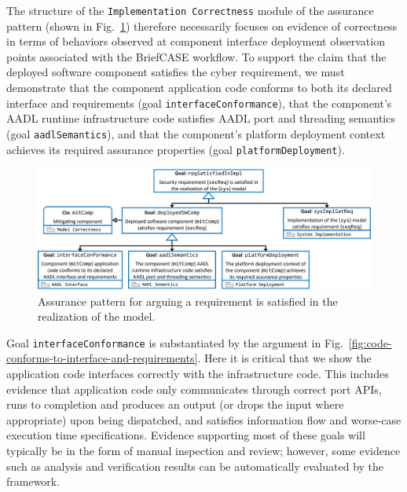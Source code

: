 The structure of the \texttt{Implementation Correctness} module of the assurance pattern (shown in Fig.~\ref{fig:req-satisfied-in-model-realization}) therefore necessarily focuses on evidence of correctness in terms of behaviors observed at component interface deployment observation points associated with the BriefCASE workflow. 
%
To support the claim that the deployed software component satisfies the cyber requirement, we must demonstrate that the component application code conforms to both its declared interface and requirements (goal \texttt{interfaceConformance}), that the component's AADL runtime infrastructure code satisfies AADL port and threading semantics (goal \texttt{aadlSemantics}), and that the component's platform deployment context achieves its required assurance properties (goal \texttt{platformDeployment}).

\begin{figure}[h] 
	\centering 
	\includegraphics[width=\textwidth]{figs/req-satisfied-in-model-realization.png}
	\caption{Assurance pattern for arguing a requirement is satisfied in the realization of the model.}
	\label{fig:req-satisfied-in-model-realization} 
\end{figure}
\vspace{-3mm}

Goal \texttt{interfaceConformance} is substantiated by the argument in Fig.~\ref{fig:code-conforms-to-interface-and-requirements}.  Here it is critical that we show the application code interfaces correctly with the infrastructure code.  This includes evidence that application code only communicates through correct port APIs, runs to completion and produces an output (or drops the input where appropriate) upon being dispatched, and satisfies information flow and worse-case execution time specifications.  Evidence supporting most of these goals will typically be in the form of manual inspection and review; however, some evidence such as analysis and verification results can be automatically evaluated by the framework.

